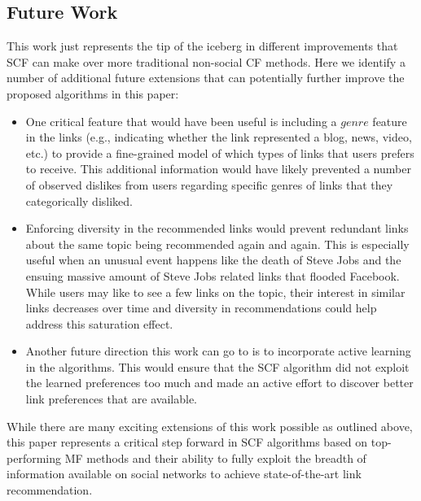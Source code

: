 \subsection{Future Work}

This work just represents the tip of the iceberg in different
improvements that SCF can make over more traditional non-social CF
methods.  Here we identify a number of additional future extensions
that can potentially further improve the proposed algorithms in this paper:
\begin{itemize}
\item One critical feature that
would have been useful is including a $\mathit{genre}$ feature in the
links (e.g., indicating whether the link represented a blog, news,
video, etc.)  to provide a fine-grained model of which types of links
that users prefers to receive.  This additional information would have
likely prevented a number of observed dislikes from users regarding
specific genres of links that they categorically disliked.
\item Enforcing diversity in the recommended links would prevent
redundant links about the same topic being recommended again and
again. This is especially useful when an unusual event happens like
the death of Steve Jobs and the ensuing massive amount of Steve Jobs
related links that flooded Facebook.  While users may like to see a
few links on the topic, their interest in similar links decreases over
time and diversity in recommendations could help address this
saturation effect.
\item Another future direction this work can go to is to incorporate
active learning in the algorithms.  This would ensure that the SCF
algorithm did not exploit the learned preferences too much and made an
active effort to discover better link preferences that are available.
\end{itemize}
While there are many exciting extensions of this work possible as
outlined above, this paper represents a critical step forward in SCF
algorithms based on top-performing MF methods and their ability to
fully exploit the breadth of information available on social networks
to achieve state-of-the-art link recommendation.

